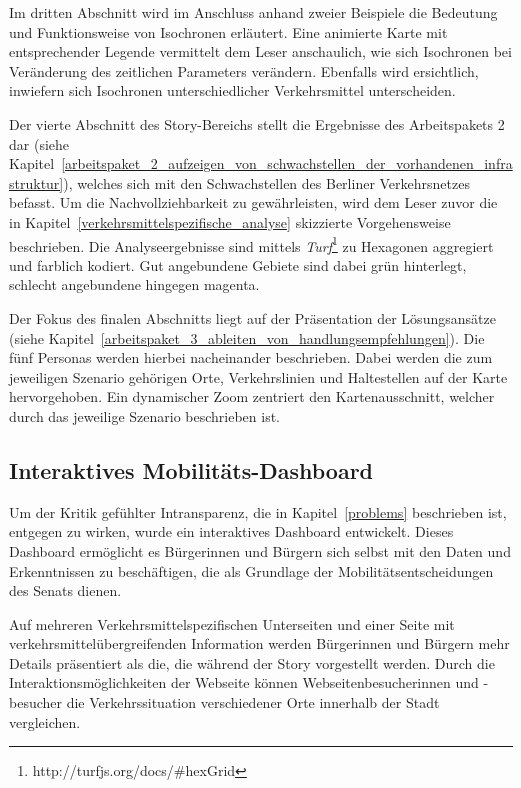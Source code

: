 Im dritten Abschnitt wird im Anschluss anhand zweier Beispiele die Bedeutung und Funktionsweise von Isochronen erläutert. Eine animierte Karte mit entsprechender Legende vermittelt dem Leser anschaulich, wie sich Isochronen bei Veränderung des zeitlichen Parameters verändern. Ebenfalls wird ersichtlich, inwiefern sich Isochronen unterschiedlicher Verkehrsmittel unterscheiden.

Der vierte Abschnitt des Story-Bereichs stellt die Ergebnisse des Arbeitspakets 2 dar (siehe Kapitel~\ref{arbeitspaket_2_aufzeigen_von_schwachstellen_der_vorhandenen_infrastruktur}), welches sich mit den Schwachstellen des Berliner Verkehrsnetzes befasst. Um die Nachvollziehbarkeit zu gewährleisten, wird dem Leser zuvor die in Kapitel~\ref{verkehrsmittelspezifische_analyse} skizzierte Vorgehensweise beschrieben. Die Analyseergebnisse sind mittels \emph{Turf}\footnote{http://turfjs.org/docs/\#hexGrid} zu Hexagonen aggregiert und farblich kodiert. Gut angebundene Gebiete sind dabei grün hinterlegt, schlecht angebundene hingegen magenta.

Der Fokus des finalen Abschnitts liegt auf der Präsentation der Lösungsansätze (siehe Kapitel~\ref{arbeitspaket_3_ableiten_von_handlungsempfehlungen}). Die fünf Personas werden hierbei nacheinander beschrieben. Dabei werden die zum jeweiligen Szenario gehörigen Orte, Verkehrslinien und Haltestellen auf der Karte hervorgehoben. Ein dynamischer Zoom zentriert den Kartenausschnitt, welcher durch das jeweilige Szenario beschrieben ist.

\subsection{Interaktives Mobilitäts-Dashboard}
\label{interaktives_mobilitaets_dashboard}

Um der Kritik gefühlter Intransparenz, die in Kapitel~\ref{problems} beschrieben ist, entgegen zu wirken, wurde ein interaktives Dashboard entwickelt. Dieses Dashboard ermöglicht es Bürgerinnen und Bürgern sich selbst mit den Daten und Erkenntnissen zu beschäftigen, die als Grundlage der Mobilitätsentscheidungen des Senats dienen.

Auf mehreren Verkehrsmittelspezifischen Unterseiten und einer Seite mit verkehrsmittelübergreifenden Information werden Bürgerinnen und Bürgern mehr Details präsentiert als die, die während der Story vorgestellt werden. Durch die Interaktionsmöglichkeiten der Webseite können Webseitenbesucherinnen und -besucher die Verkehrssituation verschiedener Orte innerhalb der Stadt vergleichen.

